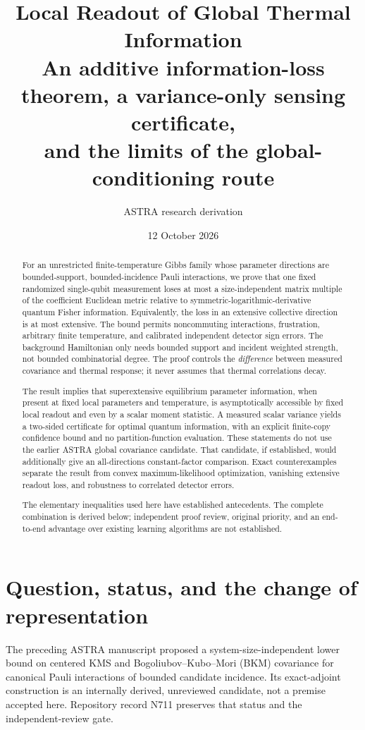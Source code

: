 \documentclass[11pt,a4paper]{article}
\title{\textbf{Local Readout of Global Thermal Information}\\[5pt]
\large An additive information-loss theorem, a variance-only sensing certificate,\\and the limits of the global-conditioning route}
\author{ASTRA research derivation}
\date{12 October 2026}
\theoremstyle{remark}
\begin{document}
\maketitle
\thispagestyle{empty}

\begin{abstract}
For an unrestricted finite-temperature Gibbs family whose parameter directions are bounded-support, bounded-incidence Pauli interactions, we prove that one fixed randomized single-qubit measurement loses at most a size-independent matrix multiple of the coefficient Euclidean metric relative to symmetric-logarithmic-derivative quantum Fisher information. Equivalently, the loss in an extensive collective direction is at most extensive. The bound permits noncommuting interactions, frustration, arbitrary finite temperature, and calibrated independent detector sign errors. The background Hamiltonian only needs bounded support and incident weighted strength, not bounded combinatorial degree. The proof controls the \emph{difference} between measured covariance and thermal response; it never assumes that thermal correlations decay.

The result implies that superextensive equilibrium parameter information, when present at fixed local parameters and temperature, is asymptotically accessible by fixed local readout and even by a scalar moment statistic. A measured scalar variance yields a two-sided certificate for optimal quantum information, with an explicit finite-copy confidence bound and no partition-function evaluation. These statements do not use the earlier ASTRA global covariance candidate. That candidate, if established, would additionally give an all-directions constant-factor comparison. Exact counterexamples separate the result from convex maximum-likelihood optimization, vanishing extensive readout loss, and robustness to correlated detector errors.

The elementary inequalities used here have established antecedents. The complete combination is derived below; independent proof review, original priority, and an end-to-end advantage over existing learning algorithms are not established.
\end{abstract}

\section{Question, status, and the change of representation}

The preceding ASTRA manuscript proposed a system-size-independent lower bound on centered KMS and Bogoliubov--Kubo--Mori (BKM) covariance for canonical Pauli interactions of bounded candidate incidence. Its exact-adjoint construction is an internally derived, unreviewed candidate, not a premise accepted here. Repository record N711 preserves that status and the independent-review gate.
\end{document}
